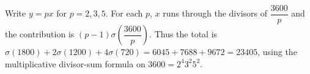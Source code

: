 Write $y=px$ for $p=2,3,5$. For each $p$, $x$ runs through the divisors of $\dfrac{3600}{p}$ and the contribution is $(p-1)\sigma(\dfrac{3600}{p})$. Thus the total is $\sigma(1800)+2\sigma(1200)+4\sigma(720)=6045+7688+9672=\boxed{23405}$, using the multiplicative divisor-sum formula on $3600=2^4 3^2 5^2$.
